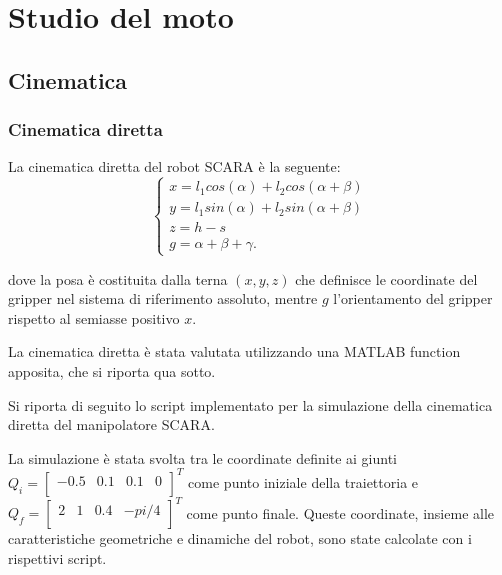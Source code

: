 \chapter{Studio del moto}

\section{Cinematica}

\subsection{Cinematica diretta}
\graphicspath{{media/2_kin_din/1_cin_dir}}

La cinematica diretta del robot SCARA è la seguente:
\[
\begin{cases}
    x = l_1 cos(\alpha)+l_2 cos(\alpha+\beta)\\
    y = l_1 sin(\alpha)+l_2 sin(\alpha+\beta)\\
    z = h - s\\
    g = \alpha+\beta+\gamma.
\end{cases}\]

dove la posa è costituita dalla terna $(x,y,z)$ che definisce le coordinate del gripper nel sistema di riferimento assoluto, mentre $g$ l'orientamento del gripper rispetto al semiasse positivo $x$.

La cinematica diretta è stata valutata utilizzando una MATLAB function apposita, che si riporta qua sotto.



Si riporta di seguito lo script implementato per la simulazione della cinematica diretta del manipolatore SCARA.



La simulazione è stata svolta tra le coordinate definite ai giunti $Q_i = \begin{bmatrix}
    -0.5 & 0.1 & 0.1 & 0\\
\end{bmatrix}^{T}$ come punto iniziale della traiettoria e $Q_f = \begin{bmatrix}
    2 & 1 & 0.4 & -pi/4\\
\end{bmatrix}^{T}$ come punto finale. Queste coordinate, insieme alle caratteristiche geometriche e dinamiche del robot, sono state calcolate con i rispettivi script.

